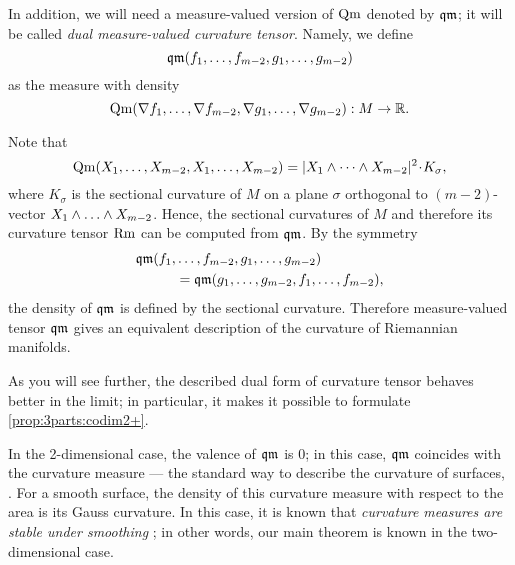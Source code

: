 In addition, we will need a measure-valued version of $\operatorname{\rm Qm}$ denoted by $\operatorname{\mathfrak{qm}}$;
it will be called \emph{dual measure-valued curvature tensor}.
Namely, we define 
\[\qm(f_1,\zz\dots,f_{m-2},g_1,\zz\dots,g_{m-2})\]
as the measure with density
\[\operatorname{\rm Qm}(\nabla f_1,\dots,\nabla f_{m-2},\nabla g_1,\dots,\nabla g_{m-2}): M\to\mathbb{R}.\]

Note that 
$$\Qm(X_1,\dots,X_{m-2},X_1,\dots,X_{m-2})
=
|X_1\wedge\dots \wedge X_{m-2}|^2\cdot K_\sigma, $$
where $K_\sigma$ is the sectional curvature of $M$ 
on a plane $\sigma$ orthogonal to $(m-2)$-vector
$X_1\wedge\zz\dots \wedge X_{m-2}$.
Hence, the sectional curvatures of $M$ and therefore its curvature tensor $\operatorname{\rm Rm}$ can  be computed from
$\operatorname{\mathfrak{qm}}$.
By the symmetry
\begin{align*}
\operatorname{\mathfrak{qm}}(f_1,&\dots,f_{m-2},g_1,\dots,g_{m-2})
\\
&=
\operatorname{\mathfrak{qm}}(g_1,\dots,g_{m-2},f_1,\dots,f_{m-2}),
\end{align*}
the density of $\operatorname{\mathfrak{qm}}$ is defined by the sectional curvature.
Therefore measure-valued tensor $\operatorname{\mathfrak{qm}}$
gives an equivalent description of the curvature of Riemannian manifolds.

As you will see further, the described dual form of curvature tensor behaves better in the limit;
in particular, it makes it possible to formulate \ref{prop:3parts:codim2+}.

In the 2-dimensional case, the valence of $\operatorname{\mathfrak{qm}}$ is $0$;
in this case, $\operatorname{\mathfrak{qm}}$ coincides with the curvature measure --- the standard way to describe the curvature of surfaces, 
\cite{Resh,AZ}.
For a smooth surface, the density of this curvature measure with respect to the area
is its Gauss curvature.
In this case, it is known that \textit{curvature measures are stable under smoothing} \cite[VII \S13]{AZ};
in other words, our main theorem is known in the two-dimensional case.
